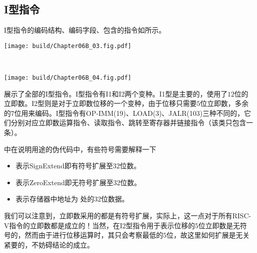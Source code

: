 \subsection{I型指令}
I型指令的编码结构、编码字段、包含的指令如所示。

\begin{Figure}[I型指令的编码]
    \begin{FigureSub}[I1型指令的编码]
        \texttt{[image: build/Chapter06B\_03.fig.pdf]}
    \end{FigureSub}\\ \vspace{0.5cm}
    \begin{FigureSub}[I2型指令的编码]
        \texttt{[image: build/Chapter06B\_04.fig.pdf]}
    \end{FigureSub}
\end{Figure}
展示了全部的I型指令。I型指令有I1和I2两个变种。I1型是主要的，使用了$12$位的立即数。I2型则是对于立即数位移的一个变种，由于位移只需要$5$位立即数，多余的$7$位用来编码。I型指令有OP-IMM(19)、LOAD(3)、JALR(103)三种不同的，它们分别对应立即数运算指令、读取指令、跳转至寄存器并链接指令（该类只包含一条）。

中在说明用途的伪代码中，有些符号需要解释一下
\begin{itemize}
    \item {} 表示SignExtend即有符号扩展至$32$位数。
    \item {} 表示ZeroExtend即无符号扩展至$32$位数。
    \item \codex{[Address]} 表示存储器中地址为 处的$32$位数据。
\end{itemize}
我们可以注意到，立即数采用的都是有符号扩展，实际上，这一点对于所有RISC-V指令的立即数都是成立的！当然，在I2型指令用于表示位移的$5$位立即数是无符号的，然而由于进行位移运算时，其只会考察最低的$5$位，故这里如何扩展是无关紧要的，不妨碍结论的成立。

